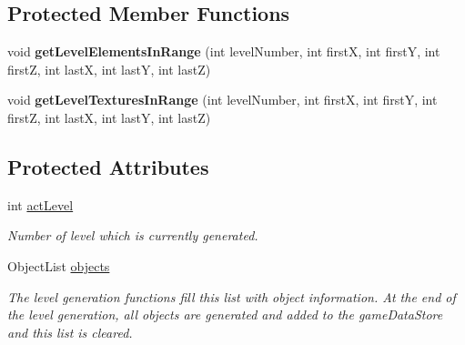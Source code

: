 \subsection*{\-Protected \-Member \-Functions}
\begin{DoxyCompactItemize}
\item 
\hypertarget{classLevel_ad794dac496c7c487652bbd8333da3277}{
void {\bfseries get\-Level\-Elements\-In\-Range} (int level\-Number, int first\-X, int first\-Y, int first\-Z, int last\-X, int last\-Y, int last\-Z)}
\label{d2/d9d/classLevel_ad794dac496c7c487652bbd8333da3277}

\item 
\hypertarget{classLevel_a11fdab484d5197c3d204f6b7ed0a8222}{
void {\bfseries get\-Level\-Textures\-In\-Range} (int level\-Number, int first\-X, int first\-Y, int first\-Z, int last\-X, int last\-Y, int last\-Z)}
\label{d2/d9d/classLevel_a11fdab484d5197c3d204f6b7ed0a8222}

\end{DoxyCompactItemize}
\subsection*{\-Protected \-Attributes}
\begin{DoxyCompactItemize}
\item 
\hypertarget{classLevel_ae62fe80ca28a82222ed024f322869603}{
int \hyperlink{classLevel_ae62fe80ca28a82222ed024f322869603}{act\-Level}}
\label{d2/d9d/classLevel_ae62fe80ca28a82222ed024f322869603}

\begin{DoxyCompactList}\small\item\em \-Number of level which is currently generated. \end{DoxyCompactList}\item 
\hypertarget{classLevel_a2813d85c0ceee4fdfdad01db52ff4630}{
\-Object\-List \hyperlink{classLevel_a2813d85c0ceee4fdfdad01db52ff4630}{objects}}
\label{d2/d9d/classLevel_a2813d85c0ceee4fdfdad01db52ff4630}

\begin{DoxyCompactList}\small\item\em \-The level generation functions fill this list with object information. \-At the end of the level generation, all objects are generated and added to the game\-Data\-Store and this list is cleared. \end{DoxyCompactList}\end{DoxyCompactItemize}


